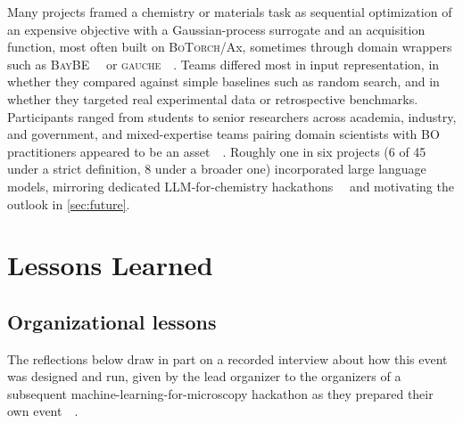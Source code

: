 \documentclass[superscriptaddress, nofootinbib,  amsmath, amssymb, twocolumn]{revtex4-2} %
\let\originalcite\cite
\renewcommand{\cite}[1]{\unskip~\originalcite{#1}}
\begin{document}
Many projects framed a chemistry or materials task as sequential optimization of an expensive objective with a Gaussian-process surrogate and an acquisition function, most often built on \textsc{BoTorch}/Ax, sometimes through domain wrappers such as \textsc{BayBE}~\cite{fitzner_baybe_2022} or \textsc{gauche}~\cite{griffiths_gauche_2024}. Teams differed most in input representation, in whether they compared against simple baselines such as random search, and in whether they targeted real experimental data or retrospective benchmarks. Participants ranged from students to senior researchers across academia, industry, and government, and mixed-expertise teams pairing domain scientists with BO practitioners appeared to be an asset~\cite{valentine_hacktive_2025, busby_building_2015}. Roughly one in six projects (6 of 45 under a strict definition, 8 under a broader one) incorporated large language models, mirroring dedicated LLM-for-chemistry hackathons~\cite{jablonka_14_2023, zimmermann_reflections_2024} and motivating the outlook in \cref{sec:future}.

\section{Lessons Learned}
\label{sec:lessons}

\subsection{Organizational lessons}
\label{sec:org-lessons}

The reflections below draw in part on a recorded interview about how this event was designed and run, given by the lead organizer to the organizers of a subsequent machine-learning-for-microscopy hackathon as they prepared their own event~\cite{baird_introduction_2024, pratiush_michackathon_2025}.
\end{document}
